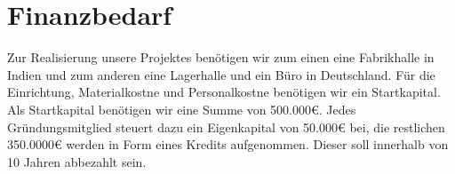 \chapter{Finanzbedarf}
\label{cha:10}
Zur Realisierung unsere Projektes benötigen wir zum einen eine Fabrikhalle in Indien und zum anderen eine Lagerhalle und ein Büro in Deutschland. Für die Einrichtung, Materialkostne und Personalkostne benötigen wir ein Startkapital.
Als Startkapital benötigen wir eine Summe von 500.000€. Jedes Gründungsmitglied steuert dazu ein Eigenkapital von 50.000€ bei, die restlichen 350.0000€ werden in Form eines Kredits aufgenommen. Dieser soll innerhalb von 10 Jahren abbezahlt sein.